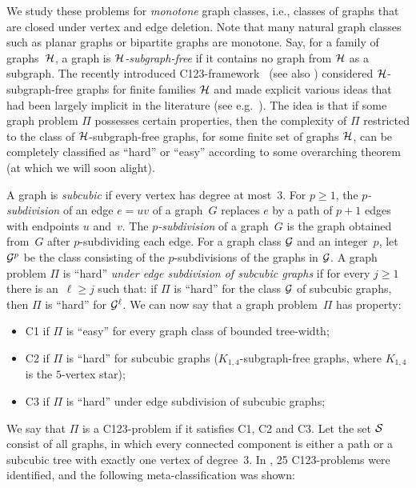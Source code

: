\documentclass[a4paper,UKenglish,cleveref, autoref,thm-restate]{lipics-v2021}
\begin{document}
We study these problems for {\it monotone} graph classes, i.e., classes of graphs that are closed under vertex and edge deletion. Note that many natural graph classes such as planar graphs or bipartite graphs are monotone. Say, for a family of graphs~${\cal H}$, a graph is {\it ${\cal H}$-subgraph-free} if it contains no graph from ${\cal H}$ as a subgraph. 
The recently introduced C123-framework~\cite{JMOPPSL25} (see also \cite{LozinMPPSSL24,JMPPSL23,BodlaenderJMOPPSL25}) considered ${\cal H}$-subgraph-free graphs for finite families ${\cal H}$ and made explicit various ideas that had been largely implicit in the literature (see e.g.~\cite{AK92,GP14,Ka12}). The idea is that if some graph problem $\Pi$ possesses certain properties, then the complexity of $\Pi$ restricted to the class of ${\cal H}$-subgraph-free graphs, for some finite set of graphs ${\cal H}$, can be completely classified as ``hard'' or ``easy'' according to some overarching theorem (at which we will soon alight).

 A graph is {\it subcubic} if every vertex has degree at most~$3$. For $p\geq 1$, the {\it $p$-subdivision} of an edge $e=uv$ of a graph~$G$ replaces $e$ by a path of $p+1$ edges with endpoints $u$ and~$v$. 
The {\it $p$-subdivision} of a graph~$G$ is the graph obtained from~$G$ after $p$-subdividing each edge.
For a graph class ${\cal G}$ and an integer~$p$, let ${\cal G}^p$ be the class consisting of the $p$-subdivisions of the graphs in ${\cal G}$.
 A graph problem $\Pi$ is ``hard'' {\it under edge subdivision of subcubic graphs} if for every $j \geq 1$ there is an~$\ell \geq j$ such that:
if $\Pi$ is ``hard'' for the class ${\cal G}$ of subcubic graphs, then $\Pi$ is ``hard'' for ${\cal G}^{\ell}$.
We can now say that a graph problem~$\Pi$ has property:\\[-9pt]
\begin{itemize}
\item {C1} if $\Pi$ is ``easy'' for every graph class of bounded tree-width;\\[-12pt]
\item {C2} if $\Pi$ is ``hard'' for subcubic graphs ($K_{1,4}$-subgraph-free graphs, where $K_{1,4}$ is the $5$-vertex star);\\[-12pt]
\item {C3} if $\Pi$ is  ``hard'' under edge subdivision of subcubic graphs;\\[-9pt]
\end{itemize}
We say that $\Pi$ is a C123-problem if it satisfies C1, C2 and C3. Let the set ${\cal S}$  consist of all graphs, in which every connected component is either a path or a subcubic tree with exactly one vertex of degree~$3$.  In \cite{JMOPPSL25},  25 C123-problems were identified, and the following meta-classification was shown:
\end{document}
